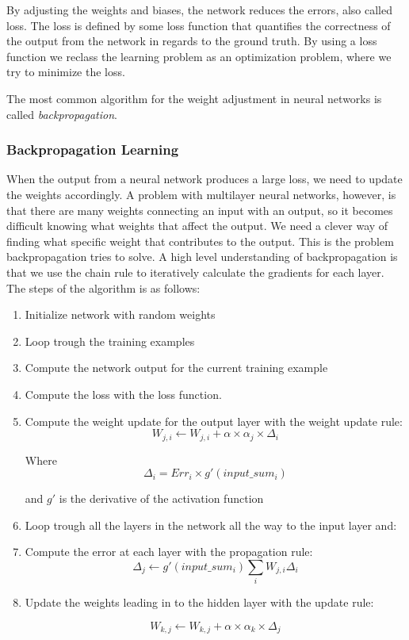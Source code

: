 By adjusting the weights and biases, the network reduces the errors, also called loss. The loss is defined by some loss function that quantifies the correctness of the output from the network in regards to the ground truth. By using a loss function we reclass the learning problem as an optimization problem, where we try to minimize the loss.

The most common algorithm for the weight adjustment in neural networks is called \emph{backpropagation}.


\subsubsection*{Backpropagation Learning}\label{subsection:backprop}
When the output from a neural network produces a large loss, we need to update the weights accordingly. A problem with multilayer neural networks, however, is that there are many weights connecting an input with an output, so it becomes difficult knowing what weights that affect the output. We need a clever way of finding what specific weight that contributes to the output. This is the problem backpropagation tries to solve. A high level understanding of backpropagation is that we use the chain rule to iteratively calculate the gradients for each layer. The steps of the algorithm is as follows:

\begin{enumerate}
	\item Initialize network with random weights
	\item Loop trough the training examples
	\item Compute the network output for the current training example
	\item Compute the loss with the loss function.
	\item Compute the weight update for the output layer with the weight update rule:
	$$
		W_{j,i} \leftarrow W_{j,i} + \alpha \times \alpha_j \times \Delta_i
	$$
	
	Where 
	$$
		\Delta_i = Err_i \times g'(input\_sum_i)
	$$
	
	and $g'$ is the derivative of the activation function
	
	\item Loop trough all the layers in the network all the way to the input layer and:
	\item Compute the error at each layer with the propagation rule:
	$$ 
		\Delta_j \leftarrow g'(input\_sum_i)\sum_{i}W_{j,i}\Delta_i
	$$
	
	\item Update the weights leading in to the hidden layer with the update rule:
	
	$$ 
		W_{k,j} \leftarrow W_{k,j} + \alpha \times \alpha_k \times \Delta_j
	$$
	
\end{enumerate}

